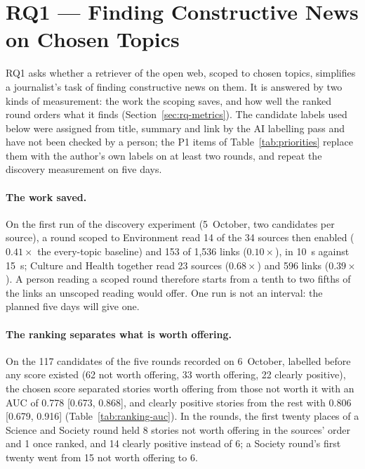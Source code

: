 
\section{RQ1 --- Finding Constructive News on Chosen Topics}
\label{sec:results-rq1}

RQ1 asks whether a retriever of the open web, scoped to chosen topics,
simplifies a journalist's task of finding constructive news on them. It
is answered by two kinds of measurement: the work the scoping saves,
and how well the ranked round orders what it finds
(Section~\ref{sec:rq-metrics}). The candidate labels used below were
assigned from title, summary and link by the AI labelling pass and have
not been checked by a person; the P1 items of
Table~\ref{tab:priorities} replace them with the author's own labels on
at least two rounds, and repeat the discovery measurement on five days.

\paragraph{The work saved.} On the first run of the discovery
experiment (5~October, two candidates per source), a round scoped to
Environment read 14 of the 34 sources then enabled ($0.41\times$ the
every-topic baseline) and 153 of 1,536 links ($0.10\times$), in 10~s
against 15~s; Culture and Health together read 23 sources
($0.68\times$) and 596 links ($0.39\times$). A person reading a scoped
round therefore starts from a tenth to two fifths of the links an
unscoped reading would offer. One run is not an interval: the planned
five days will give one.

\paragraph{The ranking separates what is worth offering.} On the 117
candidates of the five rounds recorded on 6~October, labelled before
any score existed (62 not worth offering, 33 worth offering, 22 clearly
positive), the chosen score separated stories worth offering from those
not worth it with an AUC of 0.778 [0.673, 0.868], and clearly positive
stories from the rest with 0.806 [0.679, 0.916]
(Table~\ref{tab:ranking-auc}). In the rounds, the first twenty places
of a Science and Society round held 8 stories not worth offering in
the sources' order and 1 once ranked, and 14 clearly positive instead
of 6; a Society round's first twenty went from 15 not worth offering to
6.

